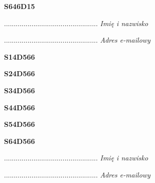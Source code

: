 \begin{turn}{90}\huge \textbf{S646D15}\end{turn}

\begin{turn}{90}\begin{minipage}{\linewidth} \vspace{20mm} ................................................  \textit{Imię i nazwisko}\end{minipage}\end{turn}

\begin{turn}{90}\begin{minipage}{\linewidth} \vspace{20mm} ................................................  \textit{Adres e-mailowy}\end{minipage}\end{turn}

\begin{turn}{90}\huge \textbf{S14D566}\end{turn}

\begin{turn}{90}\huge \textbf{S24D566}\end{turn}

\begin{turn}{90}\huge \textbf{S34D566}\end{turn}

\begin{turn}{90}\huge \textbf{S44D566}\end{turn}

\begin{turn}{90}\huge \textbf{S54D566}\end{turn}

\begin{turn}{90}\huge \textbf{S64D566}\end{turn}

\begin{turn}{90}\begin{minipage}{\linewidth} \vspace{20mm} ................................................  \textit{Imię i nazwisko}\end{minipage}\end{turn}

\begin{turn}{90}\begin{minipage}{\linewidth} \vspace{20mm} ................................................  \textit{Adres e-mailowy}\end{minipage}\end{turn}

